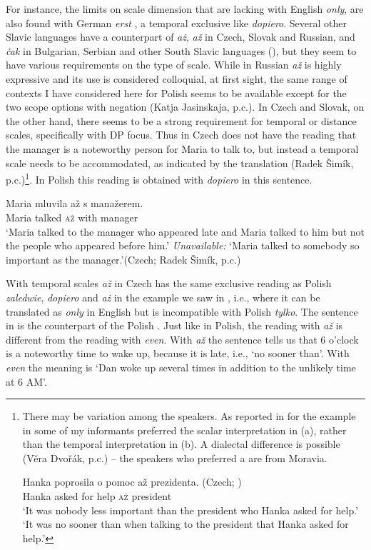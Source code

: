 \documentclass[output=paper,colorlinks,citecolor=brown]{langscibook}
\begin{document}
For instance, the limits on scale dimension that are lacking with %
English \textit{only}, are also found with %
German \textit{erst} \citep{koenig91}, a temporal exclusive like \textit{dopiero}. Several other Slavic languages have a counterpart of \textit{aż}, \textit{až} in Czech, Slovak and Russian, and \textit{čak} in Bulgarian, Serbian and other South Slavic languages (\citealt{tomaszewicz13,tomaszewicz13a}), but they seem to have various requirements on the type of scale. While in Russian \textit{až} is highly expressive and its use is considered colloquial, at first sight, the same range of contexts I have considered here for Polish seems to be available except for the two scope options with negation (Katja Jasinskaja, p.c.). In Czech and Slovak, on the other hand, there seems to be a strong requirement for temporal or distance scales, specifically with DP focus. Thus  in Czech does not have the reading that the manager is a noteworthy person for Maria to talk to, but instead a temporal scale needs to be accommodated, as indicated by the translation (Radek Šimík, p.c.)\footnote{There may be variation among the speakers. As reported in \citealt{tomaszewicz13a} for the example in  some of my informants preferred  the scalar interpretation in (a), rather than the temporal interpretation in (b). A dialectal difference is possible (Věra Dvořák, p.c.) – the speakers who preferred a are
from Moravia.

\ea\label{ex:tom:president}
\gll Hanka poprosila o pomoc až prezidenta. \hfill (Czech; \cite[(54)]{tomaszewicz13a})
\\ 
Hanka asked for help \textsc{až} president\\
\ea ‘It was nobody less important than the president who Hanka asked for help.’
\ex ‘It was no sooner than when talking to the president that Hanka asked for help.’\z 
\z
}. In Polish this reading is obtained with \textit{dopiero} in this sentence.

\ea\label{ex:tom:90}
\gll Maria mluvila až s manažerem. \\ 
Maria talked \textsc{až} with manager\\
\ea ‘Maria talked to the manager who appeared late and Maria talked to him but not the people who appeared before him.’
\ex \textit{Unavailable:} ‘Maria talked to somebody so important as the manager.’\hfill (Czech; Radek Šimík, p.c.)
\z 
\z 

\noindent With temporal scales \textit{až} in Czech has the same exclusive reading as %
Polish \textit{zaledwie}, \textit{dopiero} and \textit{aż} in the example we saw in , i.e., where it can be translated as \textit{only} in English but is incompatible with Polish \textit{tylko}. The sentence in  is the counterpart of the Polish . Just like in Polish, the reading with \textit{až} is different from the reading with \textit{even}. With \textit{až} the sentence tells us that 6 o’clock is a noteworthy time to wake up, because it is late, i.e., ‘no sooner than’. With \textit{even} the meaning is ‘Dan woke up several times in addition to the unlikely time at 6 AM’.
\end{document}
